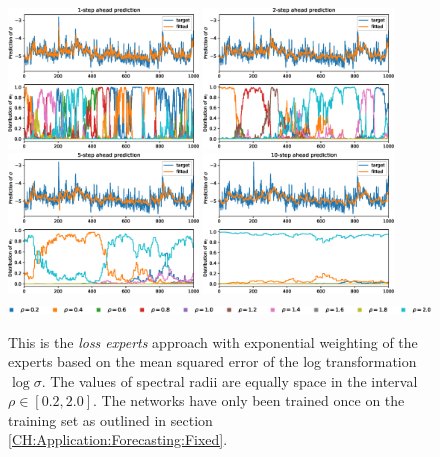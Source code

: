 \begin{figure}
    \begin{center}
        \includegraphics[width=0.45\textwidth]{Plots/Prediction/Experts_logMSE_1step.eps}
        \includegraphics[width=0.45\textwidth]{Plots/Prediction/Experts_logMSE_2step.eps} \\
        \includegraphics[width=0.45\textwidth]{Plots/Prediction/Experts_logMSE_5step.eps}
        \includegraphics[width=0.45\textwidth]{Plots/Prediction/Experts_logMSE_10step.eps} \\
        \includegraphics[width=1.0\textwidth]{Plots/Prediction/legend_experts.eps}
        \label{FIG:ExpertsLogMSE}
    \end{center}
    \caption{This is the \textit{loss experts} approach with exponential weighting of the experts based on the mean squared error of the log transformation $\log{\sigma}$. The values of spectral radii are equally space in the interval $\rho \in [0.2, 2.0]$. The networks have only been trained once on the training set as outlined in section \ref{CH:Application:Forecasting:Fixed}.}
\end{figure}

